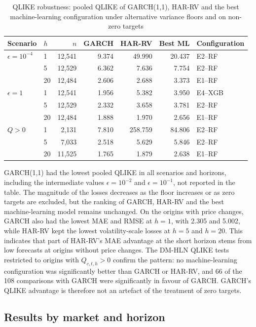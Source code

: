 \documentclass[a4paper,fleqn]{cas-sc}
\begin{document}
\begin{table}[t]
\centering
\caption{QLIKE robustness: pooled QLIKE of GARCH(1,1), HAR-RV and the best machine-learning configuration under alternative variance floors and on non-zero targets}
\label{tab:qlike_robust}
\scriptsize
\setlength{\tabcolsep}{2pt}
\begin{tabular}{@{}p{1.55cm}p{0.4cm}rrrrl@{}}
\hline
Scenario & \(h\) & \(n\) & GARCH & HAR-RV & Best ML & Configuration \\
\hline
\(\epsilon=10^{-4}\) & 1 & 12,541 & 9.374 & 49.990 & 20.437 & E2--RF \\
 & 5 & 12,529 & 6.362 & 7.636 & 7.754 & E2--RF \\
 & 20 & 12,484 & 2.606 & 2.688 & 3.373 & E1--RF \\
\hline
\(\epsilon=1\) & 1 & 12,541 & 1.956 & 5.382 & 3.950 & E4--XGB \\
 & 5 & 12,529 & 2.332 & 3.658 & 3.781 & E2--RF \\
 & 20 & 12,484 & 1.888 & 1.970 & 2.656 & E1--RF \\
\hline
\(Q>0\) & 1 & 2,131 & 7.810 & 258.759 & 84.806 & E2--RF \\
 & 5 & 7,033 & 2.518 & 5.629 & 5.846 & E2--RF \\
 & 20 & 11,525 & 1.765 & 1.879 & 2.638 & E1--RF \\
\hline
\end{tabular}
\end{table}

GARCH(1,1) had the lowest pooled QLIKE in all scenarios and horizons, including the intermediate values \(\epsilon=10^{-2}\) and \(\epsilon=10^{-1}\), not reported in the table. The magnitude of the losses decreases as the floor increases or as zero targets are excluded, but the ranking of GARCH, HAR-RV and the best machine-learning model remains unchanged. On the origins with price changes, GARCH also had the lowest MAE and RMSE at \(h=1\), with 2.305 and 5.002, while HAR-RV kept the lowest volatility-scale losses at \(h=5\) and \(h=20\). This indicates that part of HAR-RV's MAE advantage at the short horizon stems from low forecasts at origins without price changes. The DM-HLN QLIKE tests restricted to origins with \(Q_{c,t,h}>0\) confirm the pattern: no machine-learning configuration was significantly better than GARCH or HAR-RV, and 66 of the 108 comparisons with GARCH were significantly in favour of GARCH. GARCH's QLIKE advantage is therefore not an artefact of the treatment of zero targets.

\subsection{Results by market and horizon}
\label{subsec:results_heterogeneity}
\end{document}
